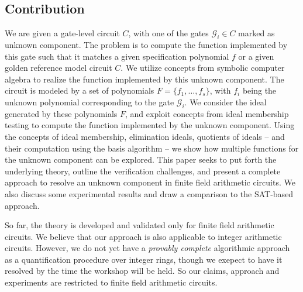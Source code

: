 \subsection{Contribution}
We are given a gate-level circuit $C$, with one of the gates
$\mathcal{G}_i \in C$ marked as unknown component. The problem is to
compute the function implemented by this gate such that it matches a
given specification polynomial $f$ or a given golden reference model
circuit $C$. We utilize concepts from symbolic computer algebra to
realize the function implemented by this unknown component. The
circuit is modeled by a set of polynomials $F=\{f_1,\dots,f_s\}$, with
$f_i$ being the unknown polynomial corresponding to the gate
$\mathcal{G}_i$. 
We consider the ideal generated by these polynomials $F$, and exploit
concepts from ideal membership testing to 
compute the function implemented by the unknown component.
Using the concepts of ideal membership, elimination ideals,
quotients of ideals -- and their computation using the \Grobner basis 
algorithm -- we show how multiple functions for the unknown component
can be explored.
This paper seeks to put forth the underlying theory, outline the
verification challenges, and present a complete approach to resolve an
unknown component in finite field arithmetic circuits. We also discuss
some experimental results and draw a comparison to the SAT-based
approach.    

So far, the theory is developed and validated only for finite field
arithmetic circuits. We believe that our approach is also
applicable to integer arithmetic circuits. However, we do not yet have a
{\it provably complete} algorithmic approach as a quantification
procedure over integer rings, though we exepect to have it resolved
by the time the workshop will be held. So our claims, approach and
experiments are restricted to finite field arithmetic circuits. 

